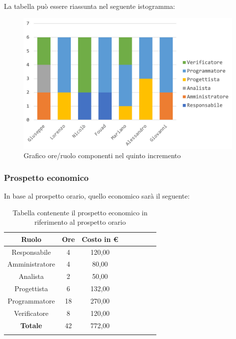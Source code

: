 		La tabella può essere riassunta nel seguente istogramma:
		\begin{figure}[H]
			\centering
			\includegraphics[width=0.8\linewidth]{./images/preventivo/incremento5-1.png}
			\caption{Grafico ore/ruolo componenti nel quinto incremento}
			\label{fig:grafico suddivione ruoli incremento V}
		\end{figure}
		
		\subsubsection{Prospetto economico}
		In base al prospetto orario, quello economico sarà il seguente: 
		
		\begin{longtable}{|c|c|c|c|c|c|c|c|}
			\hline
			\rowcolor{lighter-grayer}
			\textbf{Ruolo} & \textbf{Ore} & \textbf{Costo in € } \\
			\hline
			\endfirsthead
			
			\hline
			Responsabile 	    & 4 & 120,00\\
			\hline 
			\hline
			Amministratore	   & 4 & 80,00\\
			\hline
			\hline
			Analista 				& 2 & 50,00\\
			\hline
			\hline
			Progettista 		   & 6 & 132,00\\
			\hline
			\hline
			Programmatore 	  & 18 & 270,00\\
			\hline
			\hline
			Verificatore 		   & 8 & 120,00\\
			\hline
			\textbf{Totale} 	 & 42 & 772,00\\
			\hline
			\caption{Tabella contenente il prospetto economico in riferimento al prospetto orario}
		\end{longtable}
		\pagebreak
		
